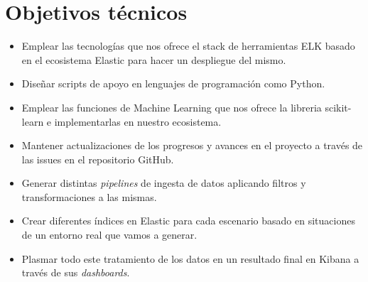\section{Objetivos técnicos}
\begin{itemize}
    \item Emplear las tecnologías que nos ofrece el stack de herramientas ELK basado en el ecosistema Elastic para hacer un despliegue del mismo.
    \item Diseñar scripts de apoyo en lenguajes de programación como Python.
    \item Emplear las funciones de Machine Learning que nos ofrece la libreria scikit-learn e implementarlas en nuestro ecosistema.
    \item Mantener actualizaciones de los progresos y avances en el proyecto a través de las issues en el repositorio GitHub.
    \item Generar distintas \textit{pipelines} de ingesta de datos aplicando filtros y transformaciones a las mismas.
    \item Crear diferentes índices en Elastic para cada escenario basado en situaciones de un entorno real que vamos a generar.
    \item Plasmar todo este tratamiento de los datos en un resultado final en Kibana a través de sus \textit{dashboards}.
\end{itemize}


